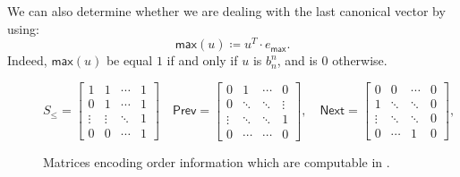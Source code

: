 We can also determine whether we are dealing with the last canonical vector by using:
$$
\mathsf{max}(u)\coloneqq u^T\cdot e_{\mathsf{max}}.
$$
Indeed, $\mathsf{max}(u)$ be equal $1$ if and only if $u$ is $b_n^n$, and is $0$ otherwise.

\begin{figure}
	\[
	S_{\leq} = \begin{bmatrix}
		1 & 1 & \cdots &  1 \\
		0 & 1 & \cdots & 1\\
		\vdots & \vdots & \ddots & 1 \\
		0 & 0 & \cdots & 1 
	\end{bmatrix} \quad\mathsf{Prev} = \begin{bmatrix}
		0 & 1 & \cdots &  0 \\
		0 & \ddots & \ddots & \vdots \\
		\vdots & \ddots & \ddots& 1 \\
		0 & \cdots & \cdots & 0
	\end{bmatrix},
	\quad \mathsf{Next} = \begin{bmatrix}
		0 & 0 & \cdots &  0 \\
		1 & \ddots & \ddots & 0\\
		\vdots & \ddots & \ddots &0 \\
		0 & \cdots & 1 & 0
	\end{bmatrix},
	\] 
	\caption{Matrices encoding order information which are computable in \langfor.}\label{fig:ordermat}
\end{figure}

